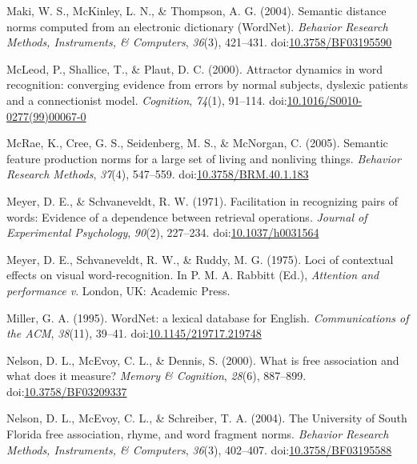 \documentclass[english,man]{apa6}
\theoremstyle{definition}
\theoremstyle{definition}
\theoremstyle{remark}
\begin{document}
\hypertarget{ref-Maki2004}{}
Maki, W. S., McKinley, L. N., \& Thompson, A. G. (2004). Semantic
distance norms computed from an electronic dictionary (WordNet).
\emph{Behavior Research Methods, Instruments, \& Computers},
\emph{36}(3), 421--431.
doi:\href{https://doi.org/10.3758/BF03195590}{10.3758/BF03195590}

\hypertarget{ref-McLeod2000}{}
McLeod, P., Shallice, T., \& Plaut, D. C. (2000). Attractor dynamics in
word recognition: converging evidence from errors by normal subjects,
dyslexic patients and a connectionist model. \emph{Cognition},
\emph{74}(1), 91--114.
doi:\href{https://doi.org/10.1016/S0010-0277(99)00067-0}{10.1016/S0010-0277(99)00067-0}

\hypertarget{ref-McRae2005}{}
McRae, K., Cree, G. S., Seidenberg, M. S., \& McNorgan, C. (2005).
Semantic feature production norms for a large set of living and
nonliving things. \emph{Behavior Research Methods}, \emph{37}(4),
547--559.
doi:\href{https://doi.org/10.3758/BRM.40.1.183}{10.3758/BRM.40.1.183}

\hypertarget{ref-Meyer1971}{}
Meyer, D. E., \& Schvaneveldt, R. W. (1971). Facilitation in recognizing
pairs of words: Evidence of a dependence between retrieval operations.
\emph{Journal of Experimental Psychology}, \emph{90}(2), 227--234.
doi:\href{https://doi.org/10.1037/h0031564}{10.1037/h0031564}

\hypertarget{ref-Meyer1975}{}
Meyer, D. E., Schvaneveldt, R. W., \& Ruddy, M. G. (1975). Loci of
contextual effects on visual word-recognition. In P. M. A. Rabbitt
(Ed.), \emph{Attention and performance v}. London, UK: Academic Press.

\hypertarget{ref-Miller1995}{}
Miller, G. A. (1995). WordNet: a lexical database for English.
\emph{Communications of the ACM}, \emph{38}(11), 39--41.
doi:\href{https://doi.org/10.1145/219717.219748}{10.1145/219717.219748}

\hypertarget{ref-Nelson2000}{}
Nelson, D. L., McEvoy, C. L., \& Dennis, S. (2000). What is free
association and what does it measure? \emph{Memory \& Cognition},
\emph{28}(6), 887--899.
doi:\href{https://doi.org/10.3758/BF03209337}{10.3758/BF03209337}

\hypertarget{ref-Nelson2004}{}
Nelson, D. L., McEvoy, C. L., \& Schreiber, T. A. (2004). The University
of South Florida free association, rhyme, and word fragment norms.
\emph{Behavior Research Methods, Instruments, \& Computers},
\emph{36}(3), 402--407.
doi:\href{https://doi.org/10.3758/BF03195588}{10.3758/BF03195588}
\end{document}
